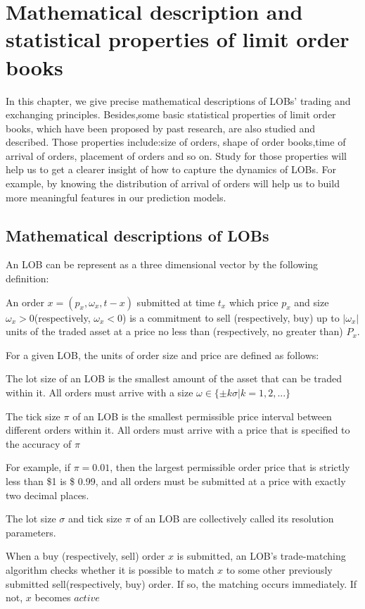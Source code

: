 \chapter{Mathematical description and statistical properties of limit order books  }
In this chapter, we give precise mathematical descriptions of LOBs' trading and exchanging principles. 
Besides,some basic statistical properties of limit order books, which have been proposed by past research, are also studied and described. Those properties include:size of orders, shape of order books,time of arrival of orders, placement of orders and so on. Study for those properties will help us to get a clearer insight of how to capture the dynamics of LOBs. For example, by knowing the distribution of arrival of orders will help us to build more meaningful features in our prediction models. 
  
\section{Mathematical descriptions of LOBs}
An LOB can be represent as a three dimensional vector by the following definition:
\begin{defn}
An order $x=(p_x, \omega_x,t-x)$ submitted at time $t_x$ which price $p_x$ and size $\omega_x>0$(respectively, $\omega_x<0$) is a commitment to sell (respectively, buy) up to $|\omega_x|$ units of the traded asset at a price no less than (respectively, no greater than) $P_x$.
\end{defn}

For a given LOB, the units of order size and price are defined as follows:
\begin{defn}
The lot size of an LOB is the smallest amount of the asset that can be traded within it. All orders must arrive with a size $\omega \in \{\pm k\sigma|k=1,2,...\}$
\end{defn}

\begin{defn}
The tick size $\pi$ of an LOB is the smallest permissible price interval between different orders within it. All orders must arrive with a price that is specified to the accuracy of $\pi$
\end{defn}

For example, if $\pi=0.01$, then the largest permissible order price that is strictly less than \$1 is \$ 0.99, and all orders must be submitted at a price with exactly two decimal places.
\begin{defn}
The lot size $\sigma$ and tick size $\pi$ of an LOB are collectively called its resolution parameters.
\end{defn} 
\begin{defn}
When a buy (respectively, sell) order $x$ is submitted, an LOB's trade-matching algorithm checks whether it is possible to match $x$ to some other previously submitted sell(respectively, buy) order. If so, the matching occurs immediately. If not, $x$ becomes $active$
\end{defn}

